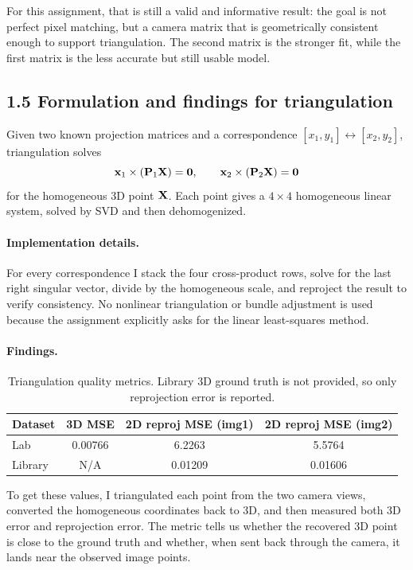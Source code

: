 {For this assignment, that is still a valid and informative result: the goal is not perfect pixel matching, but a camera matrix that is geometrically consistent enough to support triangulation. The second matrix is the stronger fit, while the first matrix is the less accurate but still usable model.

\subsection*{1.5 Formulation and findings for triangulation}
Given two known projection matrices and a correspondence $[x_1,y_1] \leftrightarrow [x_2,y_2]$, triangulation solves
\begin{equation}
\mathbf{x}_1 \times (\mathbf{P}_1\mathbf{X})=\mathbf{0}, \qquad \mathbf{x}_2 \times (\mathbf{P}_2\mathbf{X})=\mathbf{0}
\end{equation}
for the homogeneous 3D point $\mathbf{X}$. Each point gives a $4\times4$ homogeneous linear system, solved by SVD and then dehomogenized.

\paragraph{Implementation details.}
For every correspondence I stack the four cross-product rows, solve for the last right singular vector, divide by the homogeneous scale, and reproject the result to verify consistency. No nonlinear triangulation or bundle adjustment is used because the assignment explicitly asks for the linear least-squares method.

\paragraph{Findings.}
\begin{table}[h]
\centering
\begin{tabular}{lccc}
\hline
Dataset & 3D MSE & 2D reproj MSE (img1) & 2D reproj MSE (img2) \\
\hline
Lab & 0.00766 & 6.2263 & 5.5764 \\
Library & N/A & 0.01209 & 0.01606 \\
\hline
\end{tabular}
\caption{Triangulation quality metrics. Library 3D ground truth is not provided, so only reprojection error is reported.}
\label{tab:tri_metrics}
\end{table}

To get these values, I triangulated each point from the two camera views, converted the homogeneous coordinates back to 3D, and then measured both 3D error and reprojection error. The metric tells us whether the recovered 3D point is close to the ground truth and whether, when sent back through the camera, it lands near the observed image points.

}
